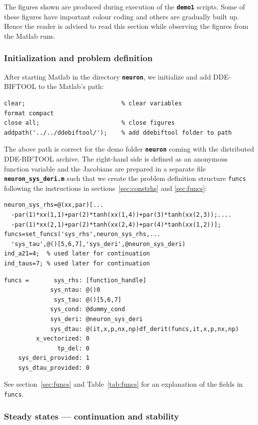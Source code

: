 \documentclass[10pt]{scrartcl}
\newcommand{\DDEBIFCODE}{\textsc{DDE-BIFTOOL}}
\newcommand{\file}[1]{\textbf{\texttt{#1}}}
\newcommand{\blist}[1]{\mbox{\lstinline!#1!}}
\begin{document}
The figures shown are produced during execution of the \file{demo1}
scripts. Some of these figures have important colour coding and others
are gradually built up.  Hence the reader is advised to read this
section while observing the figures from the Matlab runs.

\subsubsection{Initialization and problem definition}
\label{sec:demo1:init}
After starting Matlab in the directory \file{neuron},
we initialize and add \DDEBIFCODE{} to the Matlab's path:
\begin{lstlisting}
clear;                           % clear variables
format compact
close all;                       % close figures
addpath('../../ddebiftool/');    % add ddebiftool folder to path  
\end{lstlisting}
The above path is correct for the demo folder \file{neuron} coming
with the distributed \DDEBIFCODE{} archive. The right-hand side is
defined as an anonymous function variable and the Jacobians are
prepared in a separate file \file{neuron\_sys\_deri.m} such that we
create the problem definition structure \blist{funcs} following the instructions in
sections~\ref{sec:constrhs} and \ref{sec:funcs}:
\begin{lstlisting}
neuron_sys_rhs=@(xx,par)[...
  -par(1)*xx(1,1)+par(2)*tanh(xx(1,4))+par(3)*tanh(xx(2,3));....
  -par(1)*xx(2,1)+par(2)*tanh(xx(2,4))+par(4)*tanh(xx(1,2))];
funcs=set_funcs('sys_rhs',neuron_sys_rhs,...
  'sys_tau',@()[5,6,7],'sys_deri',@neuron_sys_deri)
ind_a21=4;  % used later for continuation
ind_taus=7; % used later for continuation
\end{lstlisting}
{\small
\begin{verbatim}
funcs =       sys_rhs: [function_handle]
             sys_ntau: @()0
              sys_tau: @()[5,6,7]
             sys_cond: @dummy_cond
             sys_deri: @neuron_sys_deri
             sys_dtau: @(it,x,p,nx,np)df_derit(funcs,it,x,p,nx,np)
         x_vectorized: 0
               tp_del: 0
    sys_deri_provided: 1
    sys_dtau_provided: 0
\end{verbatim}
} See section~\ref{sec:funcs} and Table~\ref{tab:funcs} for an
explanation of the fields in \blist{funcs}.  

\subsubsection{Steady states --- continuation and stability}
\label{sec:demo1:stst}
\end{document}
